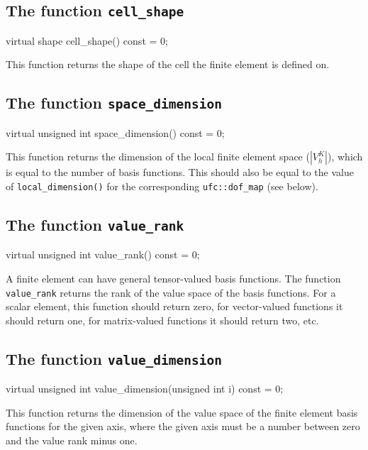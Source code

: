 \subsection{The function \texttt{cell\_shape}}

\begin{code}
virtual shape cell_shape() const = 0;
\end{code}

This function returns the shape of the cell the finite element is
defined on.

\subsection{The function \texttt{space\_dimension}}

\begin{code}
virtual unsigned int space_dimension() const = 0;
\end{code}

This function returns the dimension of the local finite element space
($|V_h^K|$), which is equal to the number of basis functions. This
should also be equal to the value of \texttt{local\_dimension()} for
the corresponding \texttt{ufc::dof\_map} (see below).

\subsection{The function \texttt{value\_rank}}

\begin{code}
virtual unsigned int value_rank() const = 0;
\end{code}

A finite element can have general tensor-valued basis functions.
The function \texttt{value\_rank} returns the rank of the value space
of the basis functions. For a scalar element, this function should
return zero, for vector-valued functions it should return one, for
matrix-valued functions it should return two, etc.

\subsection{The function \texttt{value\_dimension}}

\begin{code}
virtual unsigned int value_dimension(unsigned int i) const = 0;
\end{code}

This function returns the dimension of the value space of the finite
element basis functions for the given axis, where the given axis must
be a number between zero and the value rank minus one.

